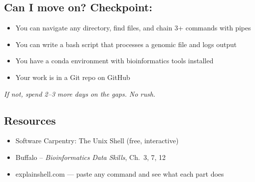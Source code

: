 \subsection{Can I move on? Checkpoint:}
\begin{itemize}[nosep]
  \item You can navigate any directory, find files, and chain 3+ commands with pipes
  \item You can write a bash script that processes a genomic file and logs output
  \item You have a conda environment with bioinformatics tools installed
  \item Your work is in a Git repo on GitHub
\end{itemize}
\textit{If not, spend 2--3 more days on the gaps. No rush.}

\subsection{Resources}
\begin{itemize}[nosep]
  \item Software Carpentry: The Unix Shell (free, interactive)
  \item Buffalo -- \textit{Bioinformatics Data Skills}, Ch.\ 3, 7, 12
  \item explainshell.com --- paste any command and see what each part does
\end{itemize}
